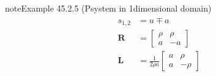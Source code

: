 \documentclass[letterpaper,10pt,english]{jupyterBook}
\begin{document}
\begin{sphinxadmonition}{note}{Example 45.2.5 (P\sphinxhyphen{}system in 1\sphinxhyphen{}dimensional domain)}
\begin{equation*}
\end{equation*}\begin{equation*}
\begin{split}\begin{aligned}
  s_{1,2} & = u \mp a \\
  \mathbf{R} & = \begin{bmatrix} \rho & \rho \\ a & -a  \end{bmatrix} \\
  \mathbf{L} & = \frac{1}{2 \rho a} \begin{bmatrix} a & \rho \\ a & -\rho  \end{bmatrix} \\
\end{aligned}\end{split}
\end{equation*}\end{sphinxadmonition}
\label{ch/pde/hyperbolic-dimensions:example-5}
\end{document}
